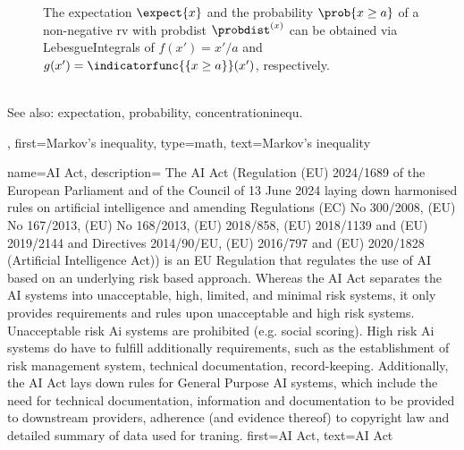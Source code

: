 {{\begin{figure}
            \caption{The \gls{expectation} $\expect\{x\}$ and the \gls{probability} $\prob{x \geq a}$ 
			    of a non-negative \gls{rv} with \gls{probdist} $\probdist^{(x)}$ 
				can be obtained via \glspl{LebesgueIntegral} of 
				$f(x') = x'/a$ and $g(x') = \indicatorfunc{\{x \geq a\}}(x')$, respectively.}
            \label{fig:markovsinequality_dict}
        \end{figure} \\
		See also: \gls{expectation}, \gls{probability}, \gls{concentrationinequ}.},
    first={Markov's inequality},
	type=math, 
    text={Markov's inequality}  
}


{name={AI Act},
	description= The AI Act (Regulation (EU) 2024/1689 of the European Parliament and of the Council of 13 June 2024 
	laying down harmonised rules on artificial intelligence and amending Regulations (EC) No 300/2008, (EU) No 167/2013, 
	(EU) No 168/2013, (EU) 2018/858, (EU) 2018/1139 and (EU) 2019/2144 and Directives 2014/90/EU, (EU) 2016/797 and (EU) 2020/1828 
	(Artificial Intelligence Act)) \cite{AIact} is an EU Regulation that regulates the use of AI based on 
	an underlying risk based approach. Whereas the AI Act separates the AI systems into unacceptable, 
	high, limited, and minimal risk systems, it only provides requirements and rules upon unacceptable and 
	high risk systems. Unacceptable risk Ai systems are prohibited (e.g. social scoring). High risk Ai systems do have to fulfill additionally
	requirements, such as the establishment of risk management system, technical documentation, 
	record-keeping. Additionally, the AI Act lays down rules for General Purpose AI systems, which include the need 
	for technical documentation, information and documentation to be provided to downstream providers, 
	adherence (and evidence thereof) to copyright law and detailed summary of data used for traning. 
	first={AI Act},
	text={AI Act}
}



